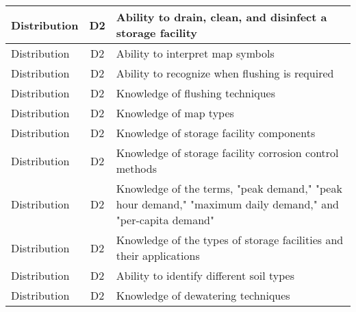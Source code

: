 \documentclass{article}
\begin{document}
\begin{table}[]
\begin{tabular}{|l|c|l|}
Distribution                           & D2             & Ability to drain,   clean, and disinfect a storage facility                                                                       \\ \hline
Distribution                           & D2             & Ability to interpret   map symbols                                                                                                \\ \hline
Distribution                           & D2             & Ability to recognize   when flushing is required                                                                                  \\ \hline
Distribution                           & D2             & Knowledge of flushing   techniques                                                                                                \\ \hline
Distribution                           & D2             & Knowledge of map   types                                                                                                          \\ \hline
Distribution                           & D2             & Knowledge of storage   facility components                                                                                        \\ \hline
Distribution                           & D2             & Knowledge of storage   facility corrosion control methods                                                                         \\ \hline
Distribution                           & D2             & Knowledge of the   terms, "peak demand," "peak hour demand," "maximum   daily demand," and "per-capita demand"                    \\ \hline
Distribution                           & D2             & Knowledge of the   types of storage facilities and their applications                                                             \\ \hline
Distribution                           & D2             & Ability to identify   different soil types                                                                                        \\ \hline
Distribution                           & D2             & Knowledge of   dewatering techniques                                                                                              \\ \hline

\end{tabular}
\end{table}
\end{document}
